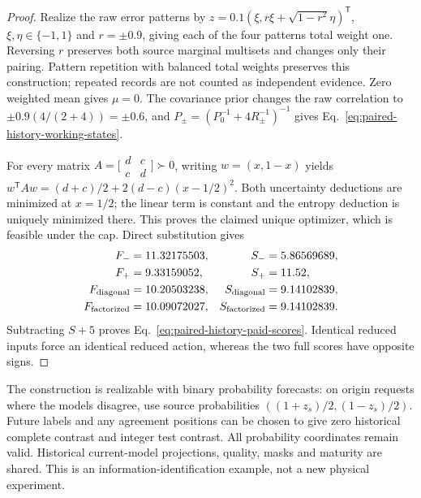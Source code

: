 \begin{proof}
Realize the raw error patterns by
$z=0.1(\xi,r\xi+\sqrt{1-r^2}\eta)^{\mathsf T}$,
$\xi,\eta\in\{-1,1\}$ and $r=\pm0.9$, giving each of the four patterns
total weight one. Reversing $r$ preserves both source marginal multisets
and changes only their pairing. Pattern repetition with balanced total
weights preserves this construction; repeated records are not counted as
independent evidence. Zero weighted mean gives $\mu=0$.
The covariance prior changes the raw correlation to
$\pm0.9(4/(2+4))=\pm0.6$, and
$P_\pm=(P_0^{-1}+4R_\pm^{-1})^{-1}$ gives
Eq.~\eqref{eq:paired-history-working-states}.

For every matrix $A=\bigl[\begin{smallmatrix}d&c\\c&d\end{smallmatrix}\bigr]
\succ0$, writing $w=(x,1-x)$ yields
$w^{\mathsf T}Aw=(d+c)/2+2(d-c)(x-1/2)^2$.
Both uncertainty deductions are minimized at $x=1/2$; the linear term is
constant and the entropy deduction is uniquely minimized there. This proves
the claimed unique optimizer, which is feasible under the cap. Direct
substitution gives
\begin{align*}
 F_-&=11.32175503,& S_-&=5.86569689,\\
 F_+&=9.33159052,& S_+&=11.52,\\
 F_{\rm diagonal}&=10.20503238,&S_{\rm diagonal}&=9.14102839,\\
 F_{\rm factorized}&=10.09072027,&S_{\rm factorized}&=9.14102839.
\end{align*}
Subtracting $S+5$ proves Eq.~\eqref{eq:paired-history-paid-scores}.
Identical reduced inputs force an identical reduced action, whereas the
two full scores have opposite signs.
\end{proof}

The construction is realizable with binary probability forecasts: on
origin requests where the models disagree, use source probabilities
$((1+z_s)/2,(1-z_s)/2)$. Future labels and any agreement positions can be
chosen to give zero historical complete contrast and integer test contrast.
All probability coordinates remain valid. Historical current-model
projections, quality, masks and maturity are shared. This is an
information-identification example, not a new physical experiment.


